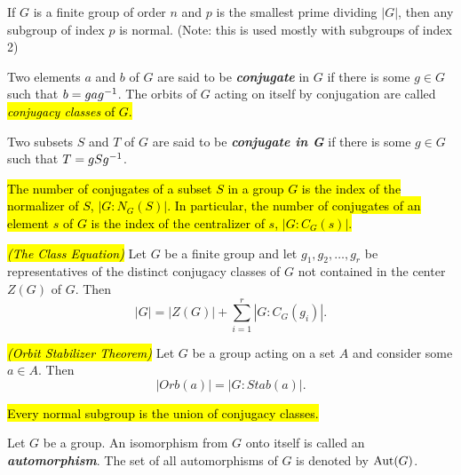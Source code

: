 \nl

\begin{cor}
If $G$ is a finite group of order $n$ and $p$ is the smallest prime dividing $|G|$, then any subgroup of index $p$ is normal. (Note: this is used mostly with subgroups of index 2)
\end{cor}

\nl

\begin{defn}
Two elements $a$ and $b$ of $G$ are said to be \textbf{\textit{conjugate}} in $G$ if there is some $g\in G$ such that $b = gag^{-1}$. The orbits of $G$ acting on itself by conjugation are called \hl{\textit{conjugacy classes} of $G$.}
\end{defn}

\nl

\begin{defn}
Two subsets $S$ and $T$ of $G$ are said to be \textbf{\textit{conjugate in G}} if there is some $g\in G$ such that $T= gSg^{-1}$.
\end{defn}

\nl

\begin{prop}
\hl{The number of conjugates of a subset $S$ in a group $G$ is the index of the normalizer of $S$, $|G:N_G(S)|$. In particular, the number of conjugates of an element $s$ of $G$ is the index of the centralizer of $s$, $|G:C_G(s)|$.}
\end{prop}

\nl

\begin{thm}\hl{\textit{(The Class Equation)}}
Let $G$ be a finite group and let $g_1,g_2,\ldots,g_r$ be representatives of the distinct conjugacy classes of $G$ not contained in the center $Z(G)$ of $G$. Then
\[|G| = |Z(G)| + \sum_{i = 1}^r |G:C_G(g_i)|.\]
\end{thm}

\nl

\begin{thm}\hl{\textit{(Orbit Stabilizer Theorem)}}
Let $G$ be a group acting on a set $A$ and consider some $a\in A$. Then
\[|Orb(a)| = |G:Stab(a)|.\]
\end{thm}

\nl

\begin{thm}
\hl{Every normal subgroup is the union of conjugacy classes.}
\end{thm}

\nl 

\begin{defn}
Let $G$ be a group. An isomorphism from $G$ onto itself is called an \textbf{\textit{automorphism}}. The set of all automorphisms of $G$ is denoted by $\text{Aut}(G)$.
\end{defn}

